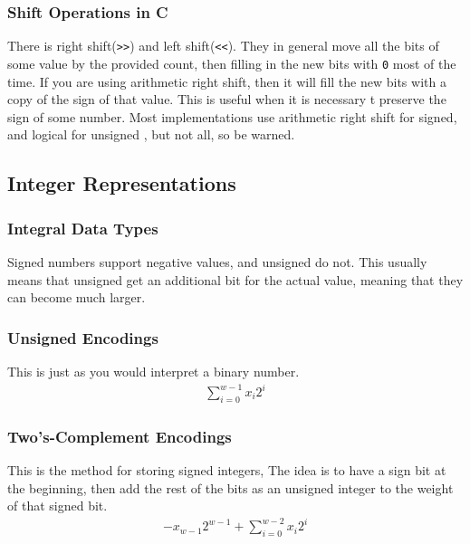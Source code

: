 \documentclass[10pt]{armath}
\newcommand{\s}[1]{\texttt{#1}}
\begin{document}
\subsubsection{Shift Operations in C}%
\label{ssub:shift_operations_in_c}

There is right shift(\s{>>}) and left shift(\s{<<}). They in general move all
the bits of some value by the provided count, then filling in the new bits
with \s{0} most of the time. If you are using arithmetic right shift, then it
will fill the new bits with a copy of the sign of that value. This is useful
when it is necessary t preserve the sign of some number. Most implementations
use arithmetic right shift for signed, and logical for unsigned , but not all,
so be warned.

\subsection{Integer Representations}%
\label{sub:integer_representations}

\subsubsection{Integral Data Types}%
\label{ssub:integral_data_types}

Signed numbers support negative values, and unsigned do not. This usually means
that unsigned get an additional bit for the actual value, meaning that they can
become much larger.

\subsubsection{Unsigned Encodings}%
\label{ssub:unsigned_encodings}

This is just as you would interpret a binary number.
\begin{align*}
  \sum_{i=0}^{w-1}x_i2^i
\end{align*}

\subsubsection{Two's-Complement Encodings}%
\label{ssub:two_s_complement_encodings}

This is the method for storing signed integers, The idea is to have a sign bit
at the beginning, then add the rest of the bits as an unsigned integer to the
weight of that signed bit.
\begin{align*}
  -x_{w-1}2^{w-1}+\sum_{i=0}^{w-2}x_i2^i
\end{align*}
\end{document}
